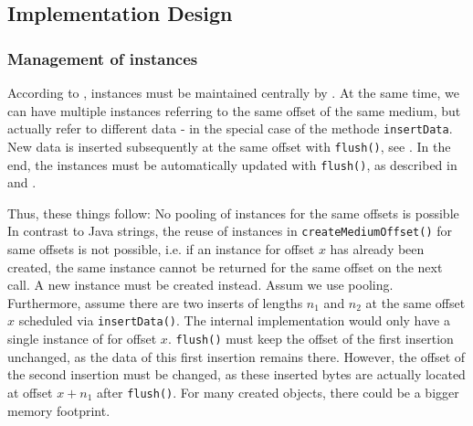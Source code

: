 \subsection{Implementation Design}
\label{sec:ImplementationDesignCOMPmedia}

\subsubsection{Management of \IMediumReference{} instances}%
\label{sec:VerwaltungderIMediumReferenceInstanzen}%

According to , \IMediumReference{} instances must be maintained centrally by \IMediumStore{}. At the same time, we can have multiple \IMediumReference{} instances referring to the same offset of the same medium, but actually refer to different data - in the special case of the methode \texttt{insertData}. New data is inserted subsequently  at the same offset with \texttt{flush()}, see . In the end, the \IMediumReference{} instances must be automatically updated with \texttt{flush()}, as described in  and .

Thus, these things follow:
{%
No pooling of \IMediumReference{} instances for the same offsets is possible
}
{%
In contrast to Java strings, the reuse of \IMediumReference{} instances in \texttt{createMediumOffset()} for same offsets is not possible, i.e. if an \IMediumReference{} instance for offset $x$ has already been created, the same instance cannot be returned for the same offset on the next call. A new \IMediumReference{} instance must be created instead.
}
{%
Assum we use pooling. Furthermore, assume there are two inserts of lengths $n_1$ and $n_2$ at the same offset $x$ scheduled via \texttt{insertData()}. The internal implementation would only have a single instance of \IMediumReference{} for offset $x$. \texttt{flush()} must keep the offset of the first insertion unchanged, as the data of this first insertion remains there. However, the offset of the second insertion must be changed, as these inserted bytes are actually located at offset $x+n_1$ after \texttt{flush()}.
}
{%
For many created \IMediumReference{} objects, there could be a bigger memory footprint.
}


